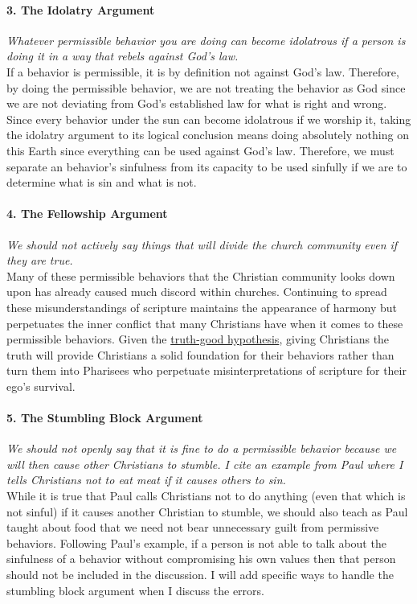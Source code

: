 \documentclass[a4paper, 12pt]{article}
\begin{document}
\paragraph{3. The Idolatry Argument} \textit{Whatever permissible behavior you are doing can become idolatrous if a person is doing it in a way that rebels against God's law.} \\
If a behavior is permissible, it is by definition not against God's law. Therefore, by doing the permissible behavior, we are not treating the behavior as God since we are not deviating from God's established law for what is right and wrong. Since every behavior under the sun can become idolatrous if we worship it, taking the idolatry argument to its logical conclusion means doing absolutely nothing on this Earth since everything can be used against God's law. Therefore, we must separate an behavior's sinfulness from its capacity to be used sinfully if we are to determine what is sin and what is not. \\
\paragraph{4. The Fellowship Argument} \textit{We should not actively say things that will divide the church community even if they are true.} \\
Many of these permissible behaviors that the Christian community looks down upon has already caused much discord within churches. Continuing to spread these misunderstandings of scripture maintains the appearance of harmony but perpetuates the inner conflict that many Christians have when it comes to these permissible behaviors. Given the \underline{truth-good hypothesis}, giving Christians the truth will provide Christians a solid foundation for their behaviors rather than turn them into Pharisees who perpetuate misinterpretations of scripture for their ego's survival. \\
\paragraph{5. The Stumbling Block Argument} \textit{We should not openly say that it is fine to do a permissible behavior because we will then cause other Christians to stumble. I cite an example from Paul where I tells Christians not to eat meat if it causes others to sin.} \\
While it is true that Paul calls Christians not to do anything (even that which is not sinful) if it causes another Christian to stumble, we should also teach as Paul taught about food that we need not bear unnecessary guilt from permissive behaviors. Following Paul's example, if a person is not able to talk about the sinfulness of a behavior without compromising his own values then that person should not be included in the discussion. I will add specific ways to handle the stumbling block argument when I discuss the errors. \\
\pagebreak
\end{document}

